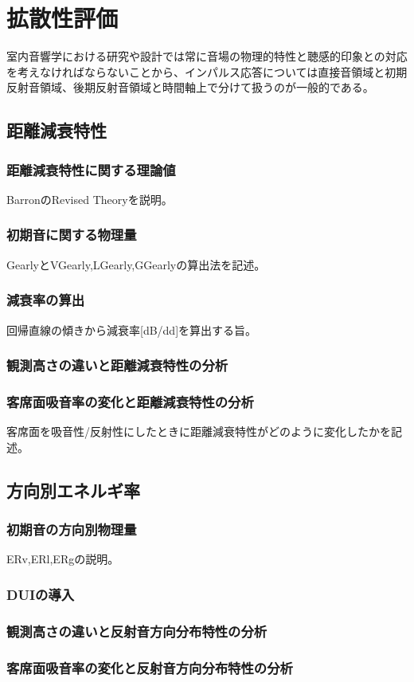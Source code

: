 \chapter{拡散性評価}
室内音響学における研究や設計では常に音場の物理的特性と聴感的印象との対応を考えなければならないことから、インパルス応答については直接音領域と初期反射音領域、後期反射音領域と時間軸上で分けて扱うのが一般的である。
\section{距離減衰特性}
\subsection{距離減衰特性に関する理論値}
BarronのRevised Theoryを説明。
\subsection{初期音に関する物理量}
GearlyとVGearly,LGearly,GGearlyの算出法を記述。
\subsection{減衰率の算出}
回帰直線の傾きから減衰率[dB/dd]を算出する旨。
\subsection{観測高さの違いと距離減衰特性の分析}
\subsection{客席面吸音率の変化と距離減衰特性の分析}
客席面を吸音性/反射性にしたときに距離減衰特性がどのように変化したかを記述。
\section{方向別エネルギ率}
\subsection{初期音の方向別物理量}
ERv,ERl,ERgの説明。
\subsection{DUIの導入}
\subsection{観測高さの違いと反射音方向分布特性の分析}
\subsection{客席面吸音率の変化と反射音方向分布特性の分析}